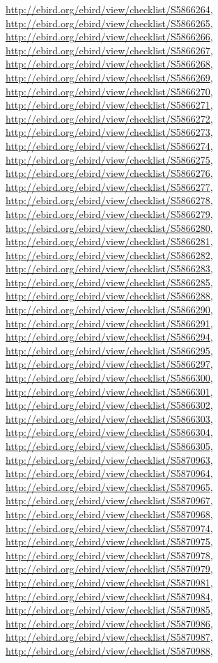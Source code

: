 \documentclass[9pt, article]{memoir}
\begin{document}
\begin{multicols}{2}
\url{http://ebird.org/ebird/view/checklist/S5866264}, 
\url{http://ebird.org/ebird/view/checklist/S5866265}, 
\url{http://ebird.org/ebird/view/checklist/S5866266}, 
\url{http://ebird.org/ebird/view/checklist/S5866267}, 
\url{http://ebird.org/ebird/view/checklist/S5866268}, 
\url{http://ebird.org/ebird/view/checklist/S5866269}, 
\url{http://ebird.org/ebird/view/checklist/S5866270}, 
\url{http://ebird.org/ebird/view/checklist/S5866271}, 
\url{http://ebird.org/ebird/view/checklist/S5866272}, 
\url{http://ebird.org/ebird/view/checklist/S5866273}, 
\url{http://ebird.org/ebird/view/checklist/S5866274}, 
\url{http://ebird.org/ebird/view/checklist/S5866275}, 
\url{http://ebird.org/ebird/view/checklist/S5866276}, 
\url{http://ebird.org/ebird/view/checklist/S5866277}, 
\url{http://ebird.org/ebird/view/checklist/S5866278}, 
\url{http://ebird.org/ebird/view/checklist/S5866279}, 
\url{http://ebird.org/ebird/view/checklist/S5866280}, 
\url{http://ebird.org/ebird/view/checklist/S5866281}, 
\url{http://ebird.org/ebird/view/checklist/S5866282}, 
\url{http://ebird.org/ebird/view/checklist/S5866283}, 
\url{http://ebird.org/ebird/view/checklist/S5866285}, 
\url{http://ebird.org/ebird/view/checklist/S5866288}, 
\url{http://ebird.org/ebird/view/checklist/S5866290}, 
\url{http://ebird.org/ebird/view/checklist/S5866291}, 
\url{http://ebird.org/ebird/view/checklist/S5866294}, 
\url{http://ebird.org/ebird/view/checklist/S5866295}, 
\url{http://ebird.org/ebird/view/checklist/S5866297}, 
\url{http://ebird.org/ebird/view/checklist/S5866300}, 
\url{http://ebird.org/ebird/view/checklist/S5866301}, 
\url{http://ebird.org/ebird/view/checklist/S5866302}, 
\url{http://ebird.org/ebird/view/checklist/S5866303}, 
\url{http://ebird.org/ebird/view/checklist/S5866304}, 
\url{http://ebird.org/ebird/view/checklist/S5866305}, 
\url{http://ebird.org/ebird/view/checklist/S5870963}, 
\url{http://ebird.org/ebird/view/checklist/S5870964}, 
\url{http://ebird.org/ebird/view/checklist/S5870965}, 
\url{http://ebird.org/ebird/view/checklist/S5870967}, 
\url{http://ebird.org/ebird/view/checklist/S5870968}, 
\url{http://ebird.org/ebird/view/checklist/S5870974}, 
\url{http://ebird.org/ebird/view/checklist/S5870975}, 
\url{http://ebird.org/ebird/view/checklist/S5870978}, 
\url{http://ebird.org/ebird/view/checklist/S5870979}, 
\url{http://ebird.org/ebird/view/checklist/S5870981}, 
\url{http://ebird.org/ebird/view/checklist/S5870984}, 
\url{http://ebird.org/ebird/view/checklist/S5870985}, 
\url{http://ebird.org/ebird/view/checklist/S5870986}, 
\url{http://ebird.org/ebird/view/checklist/S5870987}, 
\url{http://ebird.org/ebird/view/checklist/S5870988}, 

\end{multicols}
\end{document}
